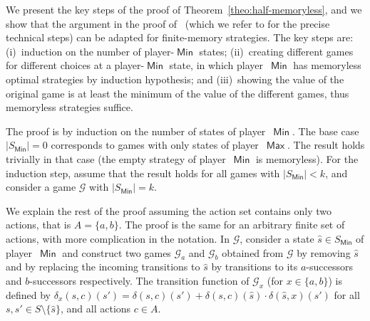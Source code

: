 \documentclass{article}
\def\abs#1{\ensuremath{\lvert #1\rvert}}
\newcommand{\GG}{\mathcal{G}}
\newcommand{\PP}{\delta}
\DeclareMathOperator{\ma}{\mathsf{Max}}
\DeclareMathOperator{\mi}{\mathsf{Min}}
\begin{document}
\smallskip{}
We present the key steps of the proof of Theorem~\ref{theo:half-memoryless}, 
and we show that the argument in the proof of~\cite[Theorem~5.2]{GK14} (which we refer to 
for the precise technical steps) can be adapted for finite-memory strategies.
The key steps are: 
(i)~induction on the number of player-$\mi$ states;
(ii)~creating different games for different choices at a player-$\mi$ state, in which
player~$\mi$ has memoryless optimal strategies by induction hypothesis;
and (iii)~showing the value of the original game is at least the minimum of the 
value of the different games, thus memoryless strategies suffice.

\smallskip\noindent{\em Induction on player-$\mi$ states.}
The proof is by induction on the number of states of player~$\mi$. The base case
$\abs{S_{\mi}} = 0$ corresponds to games with only states of player~$\ma$. 
The result holds trivially in that case (the empty strategy of player~$\mi$ 
is memoryless). For the induction step, assume that the result holds for all games
with $\abs{S_{\mi}} < k$, and consider a game $\GG$ with $\abs{S_{\mi}} = k$. 

\smallskip{}
We explain the rest of the proof assuming the action set contains only two actions, 
that is $A = \{a,b\}$. The proof is the same for an arbitrary finite set of actions, 
with more complication in the notation. 
In $\GG$, consider a state $\hat{s} \in S_{\mi}$ of player~$\mi$ and construct
two games $\GG_a$ and $\GG_b$ obtained from $\GG$ by removing $\hat{s}$ and by
replacing the incoming transitions to $\hat{s}$ by transitions to its $a$-successors
and $b$-successors respectively. The transition function of $\GG_x$ (for $x \in \{a,b\}$)
is defined by $\PP_x(s,c)(s') = \PP(s,c)(s') + \PP(s,c)(\hat{s}) \cdot \PP(\hat{s},x)(s')$
for all $s,s' \in S \setminus \{\hat{s}\}$, and all actions $c \in A$.
\end{document}
